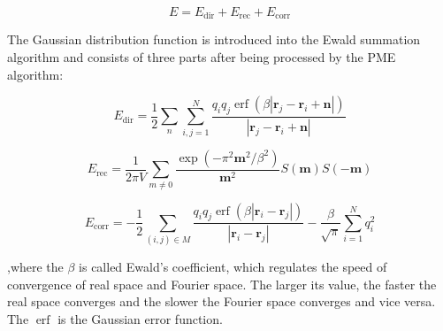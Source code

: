 \documentclass{article}
\DeclareMathOperator{\erf}{erf}
\begin{document}
\begin{center}
	\begin{equation}
		E =E_\mathrm{dir} +E_\mathrm{rec}+E_\mathrm{corr}
	\end{equation}
\end{center}

\noindent
The Gaussian distribution function is introduced into the Ewald summation algorithm and consists of three parts after being processed by the PME algorithm:

\begin{center}
	\begin{equation}
		E_\mathrm{dir} = \frac{1}{2} \sum_{n} \sum_{i,j=1}^{N} \frac{q_i q_j \erf{\left( \beta\left|\mathbf{r}_j - \mathbf{r}_i+\mathbf{n}\right|\right)}}{\left|\mathbf{r}_j - \mathbf{r}_i + \mathbf{n}\right|}
	\end{equation}
\end{center}

\begin{center}
	\begin{equation}
		E_\mathrm{rec} = \frac{1}{2\pi V}\sum_{m\neq0}{\frac{\exp{\left( -\pi^2\mathbf{m}^2/\beta^2 \right)}}{\mathbf{m}^2}S\left( \mathbf{m} \right) S \left( -\mathbf{m} \right)}
	\end{equation}
\end{center}

\begin{center}
	\begin{equation}
		E_\mathrm{corr}=-\frac{1}{2}\sum_{\left( i,j \right)\in M}\frac{q_i q_j \erf{\left( \beta\left|\mathbf{r}_i-\mathbf{r}_j\right| \right)}}{\left|\mathbf{r}_i-\mathbf{r}_j\right|}-\frac{\beta}{\sqrt\pi}\sum_{i=1}^{N}q_i^2
	\end{equation}
\end{center}
,where the $\beta$ is called Ewald's coefficient, which regulates the speed of 
convergence of real space and Fourier space. 
The larger its value, the faster the real space converges and the slower the 
Fourier space converges and vice versa.
The $\erf$ is the Gaussian error function.\\
\end{document}
